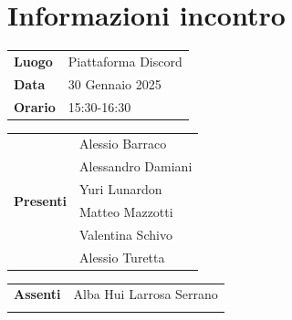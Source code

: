 \section{Informazioni incontro}
\vspace{0.25cm}
\begin{tabular}{p{1.75cm} | l}
    \textbf{Luogo} & Piattaforma Discord\\
    \textbf{Data} & 30 Gennaio 2025\\
    \textbf{Orario} & 15:30-16:30\\
\end{tabular}

\vspace{0.5cm}
\noindent
\begin{tabular}{p{1.75cm} | l}
    \multirow{7}{*}{\textbf{Presenti}}
        & Alessio Barraco\\
        & Alessandro Damiani \\ %
        & Yuri Lunardon\\
        & Matteo Mazzotti\\
        & Valentina Schivo\\
        & Alessio Turetta
\end{tabular}

\vspace{0.5cm}
\noindent
\begin{tabular}{p{1.75cm} | l}
    \multirow{1}{*}{\textbf{Assenti}}
        & Alba Hui Larrosa Serrano\\\\
\end{tabular}

